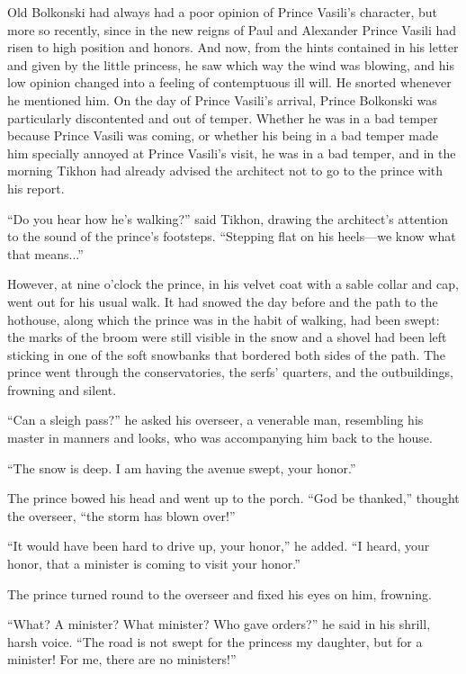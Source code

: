 Old Bolkonski had always had a poor opinion of Prince Vasili's
character, but more so recently, since in the new reigns of Paul
and Alexander Prince Vasili had risen to high position and
honors. And now, from the hints contained in his letter and given
by the little princess, he saw which way the wind was blowing,
and his low opinion changed into a feeling of contemptuous ill
will. He snorted whenever he mentioned him. On the day of Prince
Vasili's arrival, Prince Bolkonski was particularly discontented
and out of temper. Whether he was in a bad temper because Prince
Vasili was coming, or whether his being in a bad temper made him
specially annoyed at Prince Vasili's visit, he was in a bad
temper, and in the morning Tikhon had already advised the
architect not to go to the prince with his report.

``Do you hear how he's walking?'' said Tikhon, drawing the
architect's attention to the sound of the prince's
footsteps. ``Stepping flat on his heels---we know what that
means...''

However, at nine o'clock the prince, in his velvet coat with a
sable collar and cap, went out for his usual walk. It had snowed
the day before and the path to the hothouse, along which the
prince was in the habit of walking, had been swept: the marks of
the broom were still visible in the snow and a shovel had been
left sticking in one of the soft snowbanks that bordered both
sides of the path. The prince went through the conservatories,
the serfs' quarters, and the outbuildings, frowning and silent.

``Can a sleigh pass?'' he asked his overseer, a venerable man,
resembling his master in manners and looks, who was accompanying
him back to the house.

``The snow is deep. I am having the avenue swept, your honor.''

The prince bowed his head and went up to the porch. ``God be
thanked,'' thought the overseer, ``the storm has blown over!''

``It would have been hard to drive up, your honor,'' he
added. ``I heard, your honor, that a minister is coming to visit
your honor.''

The prince turned round to the overseer and fixed his eyes on
him, frowning.

``What? A minister? What minister? Who gave orders?'' he said in
his shrill, harsh voice. ``The road is not swept for the princess
my daughter, but for a minister! For me, there are no
ministers!''

